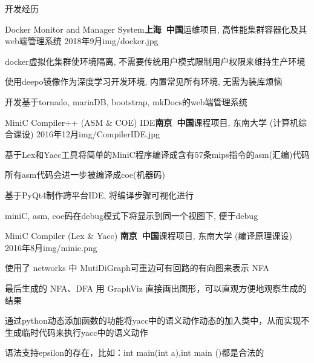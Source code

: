 \documentclass{resume_ch} %
\begin{document}
\begin{rSection}{开发经历}

\begin{rSubsection}{Docker Monitor and Manager System}{\bf 上海\ 中国}{运维项目, 高性能集群容器化及其web端管理系统 \href{https://github.com/piaozhx/DockerMonitor}{{\color{blue}{[Github]}}}    }{2018年9月}{img/docker.jpg}
    \item docker虚拟化集群使环境隔离, 不需要传统用户模式限制用户权限来维持生产环境
    \item 使用deepo镜像作为深度学习开发环境, 内置常见所有环境, 无需为装库烦恼
    \item 开发基于tornado, mariaDB, bootstrap, mkDocs的web端管理系统
\end{rSubsection}

\begin{rSubsection}{MiniC Compiler++ (ASM \& COE) IDE}{\bf 南京\ 中国}{课程项目, 东南大学 (计算机综合课设)   \href{https://github.com/piaozhx/CompilerIDE}{{\color{blue}{[Github]}}}     }{2016年12月}{img/CompilerIDE.jpg}
    \item 基于Lex和Yacc工具将简单的MiniC程序编译成含有57条mips指令的asm(汇编)代码
    \item 所有asm代码会进一步被编译成coe(机器码)
    \item 基于PyQt4制作跨平台IDE, 将编译步骤可视化进行
    \item miniC, asm, coe码在debug模式下将显示到同一个视图下, 便于debug
\end{rSubsection}


\begin{rSubsection}{MiniC Compiler (Lex \& Yacc) }{\bf 南京\ 中国}{课程项目, 东南大学 (编译原理课设)  \href{https://github.com/seucs/compiler}{{\color{blue}{[Github]}}}    }{2016年8月}{img/minic.png}
    \item 使用了 networks 中 MutiDiGraph可重边可有回路的有向图来表示 NFA
    \item 最后生成的 NFA、DFA 用 GraphViz 直接画出图形，可以直观方便地观察生成的结果
    \item 通过python动态添加函数的功能将yacc中的语义动作动态的加入类中，从而实现不生成临时代码来执行yacc中的语义动作
    \item 语法支持epsilon的存在，比如：int main(int a),int main ()都是合法的
\end{rSubsection}


\end{rSection}
\end{document}

